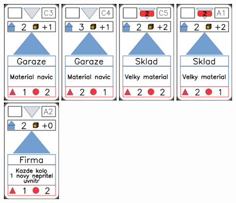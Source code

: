 \documentclass[a4paper]{article}
\begin{document}
	\includegraphics[width=3.0cm]{img-2_12}
	\includegraphics[width=3.0cm]{img-2_13}
	\includegraphics[width=3.0cm]{img-2_14}
	\includegraphics[width=3.0cm]{img-2_15}
	\includegraphics[width=3.0cm]{img-2_16}
\end{document}
